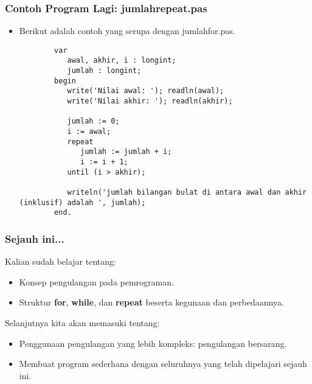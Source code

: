 \documentclass{beamer}
\begin{document}
\begin{frame}[fragile]
\frametitle{Contoh Program Lagi: jumlahrepeat.pas}
\begin{itemize}
    \item Berikut adalah contoh yang serupa dengan jumlahfor.pas.
    \begin{lstlisting}
        var
           awal, akhir, i : longint;
           jumlah : longint;
        begin
           write('Nilai awal: '); readln(awal);
           write('Nilai akhir: '); readln(akhir);

           jumlah := 0;
           i := awal;
           repeat
              jumlah := jumlah + i;
              i := i + 1;
           until (i > akhir);

           writeln('jumlah bilangan bulat di antara awal dan akhir (inklusif) adalah ', jumlah);
        end.
    \end{lstlisting}
\end{itemize}
\end{frame}

\begin{frame}
\frametitle{Sejauh ini...}
Kalian sudah belajar tentang:
\begin{itemize}
    \item Konsep pengulangan pada pemrograman.
    \item Struktur \textbf{for}, \textbf{while}, dan \textbf{repeat} beserta kegunaan dan perbedaannya.
\end{itemize}
Selanjutnya kita akan memasuki tentang:
\begin{itemize}
    \item Penggunaan pengulangan yang lebih kompleks: pengulangan bersarang.
    \item Membuat program sederhana dengan seluruhnya yang telah dipelajari sejauh ini.
\end{itemize}
\end{frame}
\end{document}
